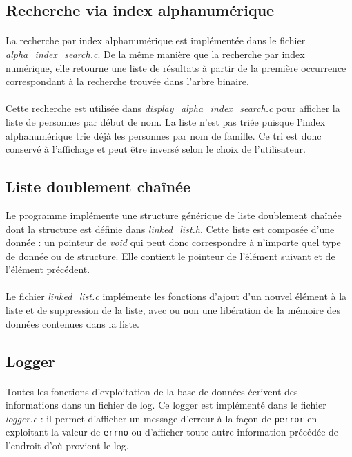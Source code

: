 \documentclass{article}
\begin{document}
    \subsection{Recherche via index alphanumérique}
    \paragraph{}
    La recherche par index alphanumérique est implémentée dans le fichier \emph{alpha\_index\_search.c}. De la même manière que la recherche par index numérique, elle retourne une liste de résultats à partir de la première occurrence correspondant à la recherche trouvée dans l'arbre binaire.

    \paragraph{}
    Cette recherche est utilisée dans \emph{display\_alpha\_index\_search.c} pour afficher la liste de personnes par début de nom. La liste n'est pas triée puisque l'index alphanumérique trie déjà les personnes par nom de famille. Ce tri est donc conservé à l'affichage et peut être inversé selon le choix de l'utilisateur.
    

    \subsection{Liste doublement chaînée}
    Le programme implémente une structure générique de liste doublement chaînée dont la structure est définie dans \emph{linked\_list.h}. Cette liste est composée d'une donnée : un pointeur de \emph{void} qui peut donc correspondre à n'importe quel type de donnée ou de structure. Elle contient le pointeur de l'élément suivant et de l'élément précédent.

    \paragraph{}
    Le fichier \emph{linked\_list.c} implémente les fonctions d'ajout d'un nouvel élément à la liste et de suppression de la liste, avec ou non une libération de la mémoire des données contenues dans la liste.


    \subsection{Logger}
    \paragraph{}
    Toutes les fonctions d'exploitation de la base de données écrivent des informations dans un fichier de log. Ce logger est implémenté dans le fichier \emph{logger.c} : il permet d'afficher un message d'erreur à la façon de \texttt{perror} en exploitant la valeur de \texttt{errno} ou d'afficher toute autre information précédée de l'endroit d'où provient le log.
\end{document}
